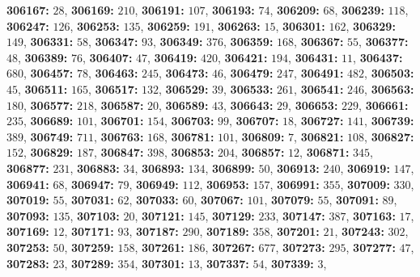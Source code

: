 \textsf{\bfseries 306167:} $28$, \textsf{\bfseries 306169:} $210$, \textsf{\bfseries 306191:} $107$, \textsf{\bfseries 306193:} $74$, \textsf{\bfseries 306209:} $68$, \textsf{\bfseries 306239:} $118$, \textsf{\bfseries 306247:} $126$, \textsf{\bfseries 306253:} $135$, \textsf{\bfseries 306259:} $191$, \textsf{\bfseries 306263:} $15$, \textsf{\bfseries 306301:} $162$, \textsf{\bfseries 306329:} $149$, \textsf{\bfseries 306331:} $58$, \textsf{\bfseries 306347:} $93$, \textsf{\bfseries 306349:} $376$, \textsf{\bfseries 306359:} $168$, \textsf{\bfseries 306367:} $55$, \textsf{\bfseries 306377:} $48$, \textsf{\bfseries 306389:} $76$, \textsf{\bfseries 306407:} $47$, \textsf{\bfseries 306419:} $420$, \textsf{\bfseries 306421:} $194$, \textsf{\bfseries 306431:} $11$, \textsf{\bfseries 306437:} $680$, \textsf{\bfseries 306457:} $78$, \textsf{\bfseries 306463:} $245$, \textsf{\bfseries 306473:} $46$, \textsf{\bfseries 306479:} $247$, \textsf{\bfseries 306491:} $482$, \textsf{\bfseries 306503:} $45$, \textsf{\bfseries 306511:} $165$, \textsf{\bfseries 306517:} $132$, \textsf{\bfseries 306529:} $39$, \textsf{\bfseries 306533:} $261$, \textsf{\bfseries 306541:} $246$, \textsf{\bfseries 306563:} $180$, \textsf{\bfseries 306577:} $218$, \textsf{\bfseries 306587:} $20$, \textsf{\bfseries 306589:} $43$, \textsf{\bfseries 306643:} $29$, \textsf{\bfseries 306653:} $229$, \textsf{\bfseries 306661:} $235$, \textsf{\bfseries 306689:} $101$, \textsf{\bfseries 306701:} $154$, \textsf{\bfseries 306703:} $99$, \textsf{\bfseries 306707:} $18$, \textsf{\bfseries 306727:} $141$, \textsf{\bfseries 306739:} $389$, \textsf{\bfseries 306749:} $711$, \textsf{\bfseries 306763:} $168$, \textsf{\bfseries 306781:} $101$, \textsf{\bfseries 306809:} $7$, \textsf{\bfseries 306821:} $108$, \textsf{\bfseries 306827:} $152$, \textsf{\bfseries 306829:} $187$, \textsf{\bfseries 306847:} $398$, \textsf{\bfseries 306853:} $204$, \textsf{\bfseries 306857:} $12$, \textsf{\bfseries 306871:} $345$, \textsf{\bfseries 306877:} $231$, \textsf{\bfseries 306883:} $34$, \textsf{\bfseries 306893:} $134$, \textsf{\bfseries 306899:} $50$, \textsf{\bfseries 306913:} $240$, \textsf{\bfseries 306919:} $147$, \textsf{\bfseries 306941:} $68$, \textsf{\bfseries 306947:} $79$, \textsf{\bfseries 306949:} $112$, \textsf{\bfseries 306953:} $157$, \textsf{\bfseries 306991:} $355$, \textsf{\bfseries 307009:} $330$, \textsf{\bfseries 307019:} $55$, \textsf{\bfseries 307031:} $62$, \textsf{\bfseries 307033:} $60$, \textsf{\bfseries 307067:} $101$, \textsf{\bfseries 307079:} $55$, \textsf{\bfseries 307091:} $89$, \textsf{\bfseries 307093:} $135$, \textsf{\bfseries 307103:} $20$, \textsf{\bfseries 307121:} $145$, \textsf{\bfseries 307129:} $233$, \textsf{\bfseries 307147:} $387$, \textsf{\bfseries 307163:} $17$, \textsf{\bfseries 307169:} $12$, \textsf{\bfseries 307171:} $93$, \textsf{\bfseries 307187:} $290$, \textsf{\bfseries 307189:} $358$, \textsf{\bfseries 307201:} $21$, \textsf{\bfseries 307243:} $302$, \textsf{\bfseries 307253:} $50$, \textsf{\bfseries 307259:} $158$, \textsf{\bfseries 307261:} $186$, \textsf{\bfseries 307267:} $677$, \textsf{\bfseries 307273:} $295$, \textsf{\bfseries 307277:} $47$, \textsf{\bfseries 307283:} $23$, \textsf{\bfseries 307289:} $354$, \textsf{\bfseries 307301:} $13$, \textsf{\bfseries 307337:} $54$, \textsf{\bfseries 307339:} $3$, 
